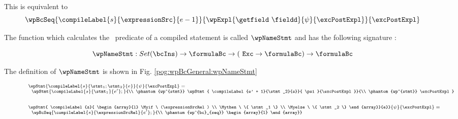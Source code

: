 This is equivalent to 
  $$\wpBcSeq{\compileLabel{s}{\expressionSrc}{e - 1}}{\wpExpl{\getfield \ \fieldd }{\psi}{\excPostExpl} }{\excPostExpl} $$  




The function which calculates the \wpName \ predicate of a compiled statement is called $\wpNameStmt$ and has the following signature :

$$\wpNameStmt : Set(\bcIns) \rightarrow  \formulaBc \rightarrow  ( \mbox{ \rm \texttt{Exc}}  \rightarrow \formulaBc ) \rightarrow \formulaBc$$ 

The definition of $\wpNameStmt$ is shown in Fig. \ref{pog:wpBcGeneral:wpNameStmt}
\begin{figure}[ht!]
\begin{frameit}
$${\scriptsize 
        \begin{array}{l} 
        \wpStmt{ \compileLabel{s}{\stmt_1;\stmt_2 }{e}}{ \psi}{\excPostExpl} = \\
                  \begin{array}{l}  
	 	   \wpStmt{\compileLabel{s}{\stmt_1}{e'};}
                          {\\
                           \phantom{wp^{stmt}} \wpStmt{ \compileLabel{e' + 1}{\stmt_2}{s}}{ \psi}{\excPostExpl}}
			  {\\ 
                           \phantom{wp^{stmt}} \excPostExpl} 
          \end{array} \\
	  \\ \\
	  \wpStmt{   \compileLabel{s}{ \begin{array}{l} \Myif \ (\expressionSrcRel) \\
                                                               \Mythen \ \{ \stmt_1 \} \\  
							       \Myelse \ \{ \stmt_2 \}   
                                              \end{array}}{e}}{\psi}{\excPostExpl} = \\ 
                     \begin{array}{l} 
                        \wpBcSeq{%
                      	                    \compileLabel{s}{\expressionSrcRel}{e'}; 
			    } {\\
                             \phantom{wp^{bc}_{seq}}	 \begin{array}{l}

\end{array}}
\end{array}
\end{array}}$$
\end{frameit}
\end{figure}
